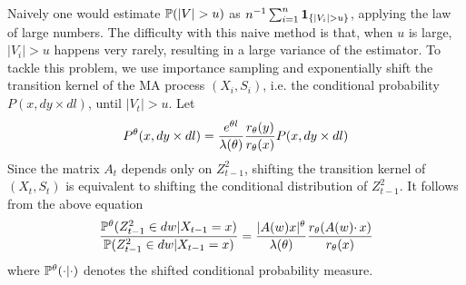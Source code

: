 
Naively one would estimate $\P(|V| > u)$ as
$n^{-1} \sum_{i=1}^n \1{|V_i| > u}$, applying the law of large
numbers. The difficulty with this naive method is that, when $u$ is
large, $|V_i| > u$ happens very rarely, resulting in a large variance
of the estimator. To tackle this problem, we use importance sampling
and exponentially shift the transition kernel of the MA process
$(X_i, S_i)$, i.e. the conditional probability $P(x, dy \times dl)$,
until $|V_t| > u$. Let
\[
P^\theta(x, dy \times dl)
=
{e^{\theta l} \over \lambda(\theta)}
{r_\theta(y) \over r_\theta(x)}
P(x, dy \times dl)
\]
Since the matrix $A_t$ depends only on $Z_{t-1}^2$, shifting the
transition kernel of $(X_t, S_t)$ is equivalent to shifting the
conditional distribution of $Z_{t-1}^2$. It follows from the above
equation
\begin{equation}
  \label{eq:sampling}
  {
    \P^\theta(Z_{t-1}^2 \in dw | X_{t-1} = x)
    \over
    \P(Z_{t-1}^2 \in dw | X_{t-1} = x)
  } = {|A(w) x|^\theta \over \lambda(\theta)}
  {
    r_\theta (A(w) \cdotp x)
    \over
    r_\theta(x)
  }
\end{equation}
where $\P^\theta(\cdot | \cdot)$ denotes the shifted conditional
probability measure.

